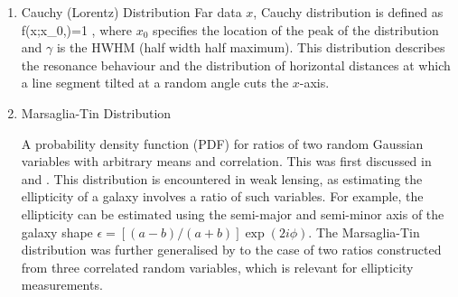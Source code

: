 {\begin{enumerate}
For $x$ being an $N\times p$ matrix, with each row being independently drawn from a $p$-variate normal distribution with mean $\mu=0$, 
the $p\times p$ random scatter matrix $\mathbf{S}=X^TX$ (note that this is the inverse of $\mathbf{S}$ in Wishart distribution) has a inverse Wishart distribution with $N$ degrees of freedom and covariance $\mathbf{C}$
%
\be
{}^{-1}_p\left(,N\right) = 
\left|  \right|^{N/2}
\exp {}\; ,
\label{eq:PD.8}
\ee
%
where $\Gamma_p$ is the multivariate Gamma function. 
In cosmology, they are useful as normally parameters precision matrices (inverse of covariance matrices) have inverse Wishart distributions. 
The Inverse-Wishart distribution is the multivariate extension of the inverse-gamma distribution --- in case of integer degrees of 
freedom, it is a multivariate generalisation of the inverse $\chi^2-$distribution; i.e. for a single data point ($p=1$), the 
inverse Wishart distribution is the inverse $\chi^2$ distribution. For examples of the use of this distribution in
weak lensing see \cite{2013MNRAS.432.1928T,2014IAUS..306...99J}
\\
\item Cauchy (Lorentz) Distribution
Far data $x$, Cauchy distribution is defined as 
%
\be
f(x;x_{0},\gamma )={1 \over \pi \gamma }\;,
\label{eq:PD.9}
\ee
%
where $x_0$ specifies the location of the peak of the distribution and $\gamma$ is the HWHM (half width half maximum). 
This distribution describes the resonance behaviour and the distribution of horizontal distances at which a line segment 
tilted at a random angle cuts the $x$-axis.
\\
\item Marsaglia-Tin Distribution

A probability density function (PDF) for ratios of two random Gaussian variables with arbitrary means and correlation. 
This was first discussed in \cite{Marsaglia:1965:RNV} and \cite{10.2307/2283154}. This distribution is encountered 
in weak lensing, as estimating the ellipticity of a galaxy involves a ratio of  
such variables. For example, the ellipticity can be estimated using the semi-major and semi-minor axis of the galaxy shape 
$\epsilon = [(a-b)/(a + b)] \exp(2i\phi)$. The Marsaglia-Tin distribution was further generalised 
by \cite{Viola01042014} to the case of two ratios constructed from three correlated random variables, which is relevant 
for ellipticity measurements.
\end{enumerate}}%

